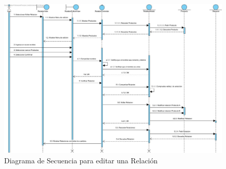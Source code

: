 \newpage %

\begin{figure}[H]
    \includegraphics[width=1\linewidth]{assets/sequence/Editar.jpg}
    \caption{Diagrama de Secuencia para editar una Relación}
   \end{figure}
\vspace{1.0cm}

\newpage %